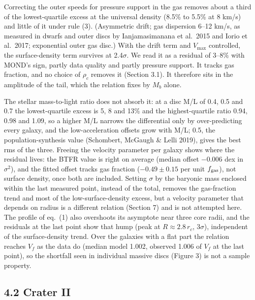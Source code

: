 \documentclass[
  10pt,
]{article}
\begin{document}
Correcting the outer speeds for pressure support in the gas removes about a third of the lowest-quartile excess at the universal density (8.5\% to 5.5\% at 8 km/s) and little of it under rule (3). (Asymmetric drift; gas dispersion 6--12 km/s, as measured in dwarfs and outer discs by Ianjamasimanana et al.~2015 and Iorio et al.~2017; exponential outer gas disc.) With the drift term and $V_{\max}$ controlled, the surface-density term survives at 2.4$\sigma$. We read it as a residual of 3--8\% with MOND's sign, partly data quality and partly pressure support. It tracks gas fraction, and no choice of $\rho_c$ removes it (Section 3.1). It therefore sits in the amplitude of the tail, which the relation fixes by $M_b$ alone.

The stellar mass-to-light ratio does not absorb it: at a disc M/L of 0.4, 0.5 and 0.7 the lowest-quartile excess is 5, 8 and 13\% and the highest-quartile ratio 0.94, 0.98 and 1.09, so a higher M/L narrows the differential only by over-predicting every galaxy, and the low-acceleration offsets grow with M/L; 0.5, the population-synthesis value (Schombert, McGaugh \& Lelli 2019), gives the best rms of the three. Freeing the velocity parameter per galaxy shows where the residual lives: the BTFR value is right on average (median offset $-0.006$ dex in $\sigma^2$), and the fitted offset tracks gas fraction ($-0.49\pm0.15$ per unit $f_{\rm gas}$), not surface density, once both are included. Setting $\sigma$ by the baryonic mass enclosed within the last measured point, instead of the total, removes the gas-fraction trend and most of the low-surface-density excess, but a velocity parameter that depends on radius is a different relation (Section 7) and is not attempted here. The profile of eq.~(1) also overshoots its asymptote near three core radii, and the residuals at the last point show that hump (peak at $R\approx2.8\,r_c$, $3\sigma$), independent of the surface-density trend. Over the galaxies with a flat part the relation reaches $V_f$ as the data do (median model 1.002, observed 1.006 of $V_f$ at the last point), so the shortfall seen in individual massive discs (Figure 3) is not a sample property.


\subsection{4.2 Crater II}
\end{document}
